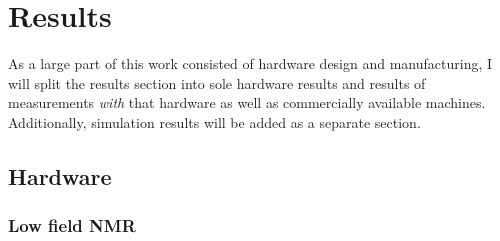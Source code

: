 \chapter{Results}\label{chap:results}
    As a large part of this work consisted of hardware design and manufacturing, I will split the results section into sole hardware results and results of measurements \textit{with} that hardware as well as commercially available machines. Additionally, simulation results will be added as a separate section.
\section{Hardware}
    \subsection{Low field NMR}
